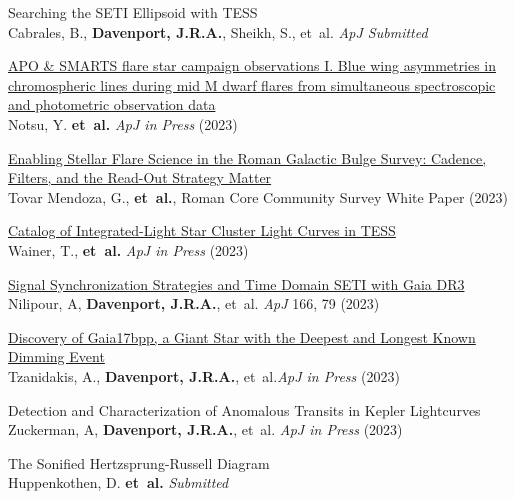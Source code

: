 \begin{etaremune}[leftmargin=10pt]
\item{\sc Searching the SETI Ellipsoid with TESS}\\
Cabrales, B., {\bf Davenport,  J.R.A.}, Sheikh, S., et~al. {\em ApJ Submitted}


\item{\sc \href{https://arxiv.org/abs/2310.02450}{\color{NavyBlue}
APO \& SMARTS flare star campaign observations I. Blue wing asymmetries in chromospheric lines during mid M dwarf flares from simultaneous spectroscopic and photometric observation data}}\\
Notsu, Y.  {\bf et~al.} {\em ApJ in Press} (2023)


\item{\sc \href{https://arxiv.org/abs/2307.05806}{\color{NavyBlue}Enabling Stellar Flare Science in the Roman Galactic Bulge Survey: Cadence, Filters, and the Read-Out Strategy Matter}}\\
Tovar Mendoza, G., {\bf et~al.}, Roman Core Community Survey White Paper (2023)

\item{\sc \href{https://arxiv.org/abs/2307.09510}{\color{NavyBlue}Catalog of Integrated-Light Star Cluster Light Curves in TESS}}\\
Wainer, T., {\bf et~al.} {\em ApJ in Press} (2023)


\item{\sc \href{https://iopscience.iop.org/article/10.3847/1538-3881/acde79}{\color{NavyBlue}Signal Synchronization Strategies and Time Domain SETI with Gaia DR3}}\\
Nilipour, A, {\bf Davenport,  J.R.A.}, et~al. {\em ApJ} 166, 79 (2023)


\item{\sc \href{https://arxiv.org/abs/2306.12409}{\color{NavyBlue}Discovery of Gaia17bpp, a Giant Star with the Deepest and Longest Known Dimming Event}}\\
Tzanidakis, A., {\bf Davenport,  J.R.A.}, et~al.{\em ApJ in Press} (2023)

\item{\sc Detection and Characterization of Anomalous Transits in Kepler Lightcurves}\\
Zuckerman, A, {\bf Davenport,  J.R.A.}, et~al. {\em ApJ in Press} (2023)



\item{\sc The Sonified Hertzsprung-Russell Diagram}\\
Huppenkothen, D. {\bf et~al.} {\em Submitted}



\end{etaremune}
